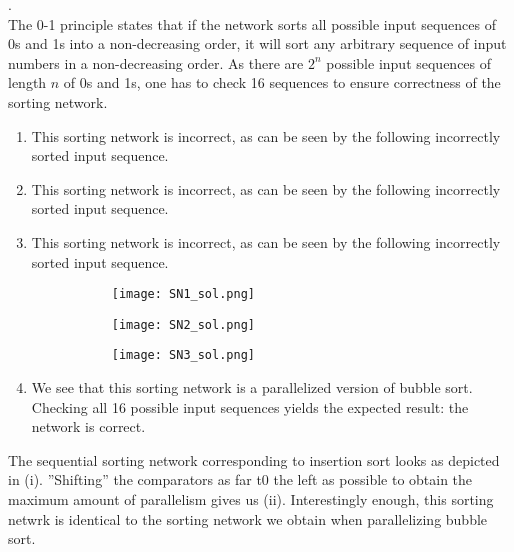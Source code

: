 \documentclass[main]{subfiles}
\begin{document}
\begin{ExerciseList}
    \Answer[ref={SN}].\quad \\
        \Question The 0-1 principle states that if the network sorts all possible input sequences of 0s and 1s into a non-decreasing order, it will sort any arbitrary sequence of input numbers in a non-decreasing order. As there are $2^n$ possible input sequences of length $n$ of 0s and 1s, one has to check 16 sequences to ensure correctness of the sorting network.
        \Question 
            \begin{enumerate}[label=(\roman*)]
                \item This sorting network is incorrect, as can be seen by the following incorrectly sorted input sequence.
                \item This sorting network is incorrect, as can be seen by the following incorrectly sorted input sequence.
                \item This sorting network is incorrect, as can be seen by the following incorrectly sorted input sequence.
                \begin{figure}[H]
                    \centering
                    \begin{subfigure}{.5\textwidth}
                        \centering
                        \texttt{[image: SN1\_sol.png]}
                        \caption{}
                    \end{subfigure}%
                    \begin{subfigure}{.5\textwidth}
                        \centering
                        \texttt{[image: SN2\_sol.png]}
                        \caption{}
                    \end{subfigure}
                    \begin{subfigure}{.5\textwidth}
                        \centering
                        \texttt{[image: SN3\_sol.png]}
                        \caption{}
                    \end{subfigure}
                \end{figure}
                \item We see that this sorting network is a parallelized version of bubble sort. Checking all 16 possible input sequences yields the expected result: the network is correct.
            \end{enumerate}
        \Question The sequential sorting network corresponding to insertion sort looks as depicted in (i). ''Shifting'' the comparators as far t0 the left as possible to obtain the maximum amount of parallelism gives us (ii). Interestingly  enough, this sorting netwrk is identical to the sorting network we obtain when parallelizing bubble sort.

\end{ExerciseList}
\end{document}
